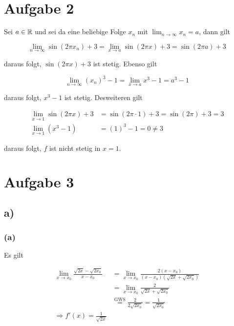 \documentclass[a4paper, 11pt]{article}
\begin{document}
\section{Aufgabe 2}
\label{sec:orgd486413}
Sei \(a \in \mathbb{R}\) und sei da eine beliebige Folge \(x_n\) mit
\(\lim_{n \rightarrow \infty} x_n = a\), dann gilt

$$ \lim_{n \rightarrow \infty} \sin(2\pi x_n) + 3 =
    \lim_{x \rightarrow a} \sin(2\pi x) + 3 = \sin(2\pi a) + 3 $$

daraus folgt, \(\sin(2\pi x) + 3\) ist stetig. \newline
Ebenso gilt

$$ \lim_{n \rightarrow \infty} (x_n)^3 - 1 =
    \lim_{x \rightarrow a} x^3 - 1 = a^3 - 1 $$

daraus folgt, \(x^3 - 1\) ist stetig. \newline
Desweiteren gilt

\begin{align*}
    \lim_{x \rightarrow 1} \sin(2\pi x) + 3 &= \sin(2\pi \cdot 1) + 3 =
        \sin(2\pi) + 3 = 3 \\
    \lim_{x \rightarrow 1} (x^3 - 1) &= (1)^3 - 1 = 0 \neq 3
\end{align*}

daraus folgt, \(f\) ist nicht stetig in \(x = 1\).

\section{Aufgabe 3}
\label{sec:org0e61ea9}
\subsection{a)}
\label{sec:org768c34b}
\subsubsection{(a)}
\label{sec:org8bb911b}
Es gilt

\begin{align*}
    \lim_{x \rightarrow x_0} \frac{\sqrt{2x} - \sqrt{2x_0}}{x - x_0} &=
        \lim_{x \rightarrow x_0}
            \frac{2(x - x_0)}{(x - x_0)(\sqrt{2x} + \sqrt{2x_0})} \\
    &= \lim_{x \rightarrow x_0} \frac{2}{\sqrt{2x} + \sqrt{2x_0}} \\
    & \overset{\text{GWS}}{=}
        \frac{2}{2 \sqrt{2x_0}} = \frac{1}{\sqrt{2x_0}} \\
    \Rightarrow f'(x) = \frac{1}{\sqrt{2x}}
\end{align*}
\end{document}
